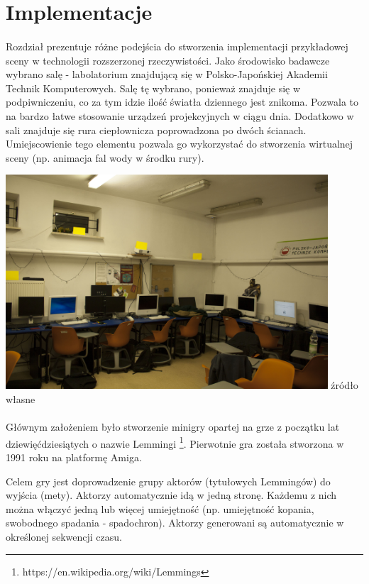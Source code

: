 \newpage
\section{Implementacje}
\paragraph{}
Rozdział prezentuje różne podejścia do stworzenia implementacji przykładowej sceny  w technologii rozszerzonej rzeczywistości.
Jako środowisko badawcze wybrano salę - labolatorium znajdującą się w Polsko-Japońskiej Akademii Technik Komputerowych. Salę tę wybrano, ponieważ znajduje się w podpiwniczeniu, co za tym idzie ilość światła dziennego jest znikoma. Pozwala to na bardzo łatwe stosowanie urządzeń projekcyjnych w ciągu dnia. Dodatkowo w sali znajduje się rura ciepłownicza poprowadzona po dwóch ścianach. Umiejscowienie tego elementu pozwala go wykorzystać do stworzenia wirtualnej sceny (np. animacja fal wody w środku rury).

\begin{center}
\includegraphics[width=0.9\textwidth]{images/s9.jpg}
\small {źródło własne }
\end{center}

\paragraph{}
Głównym założeniem było stworzenie minigry opartej na grze z początku lat dziewięćdziesiątych o nazwie Lemmingi \footnote{https://en.wikipedia.org/wiki/Lemmings}. Pierwotnie gra została stworzona w 1991 roku na platformę Amiga.

Celem gry jest doprowadzenie grupy aktorów (tytułowych Lemmingów) do wyjścia (mety). Aktorzy automatycznie idą w jedną stronę. Każdemu z nich można włączyć jedną lub więcej umiejętność (np. umiejętność kopania, swobodnego spadania - spadochron). Aktorzy generowani są automatycznie w określonej sekwencji czasu.

